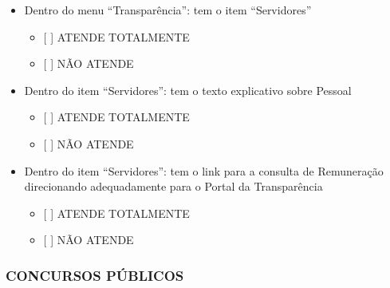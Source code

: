 \documentclass[]{book}
\providecommand{\tightlist}{%
  \setlength{\itemsep}{0pt}\setlength{\parskip}{0pt}}
\begin{document}
\begin{itemize}
\tightlist
\item
  Dentro do menu ``Transparência'': tem o item ``Servidores''

  \begin{itemize}
  \tightlist
  \item
    {[} {]} ATENDE TOTALMENTE
  \item
    {[} {]} NÃO ATENDE
  \end{itemize}
\item
  Dentro do item ``Servidores'': tem o texto explicativo sobre Pessoal

  \begin{itemize}
  \tightlist
  \item
    {[} {]} ATENDE TOTALMENTE
  \item
    {[} {]} NÃO ATENDE
  \end{itemize}
\item
  Dentro do item ``Servidores'': tem o link para a consulta de Remuneração direcionando adequadamente para o Portal da Transparência

  \begin{itemize}
  \tightlist
  \item
    {[} {]} ATENDE TOTALMENTE
  \item
    {[} {]} NÃO ATENDE
  \end{itemize}
\end{itemize}

\hypertarget{concursos-puxfablicos-1}{%
\subsubsection*{CONCURSOS PÚBLICOS}\label{concursos-puxfablicos-1}}
\end{document}
